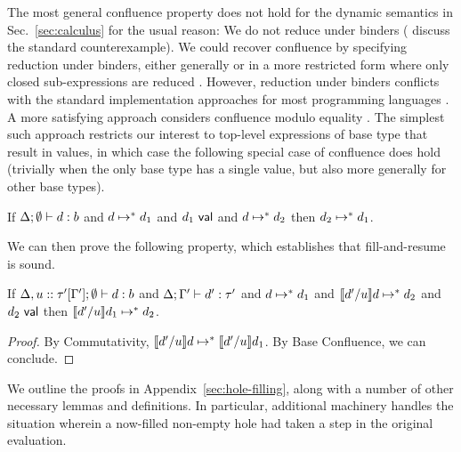 The most general confluence property does not hold for the dynamic
semantics in Sec.~\ref{sec:calculus} for the usual reason: We do not
reduce under binders (\citet{DBLP:conf/birthday/BlancLM05} discuss the
standard counterexample).
%
We could recover confluence by specifying reduction under binders,
either generally or in a more restricted form where only closed
sub-expressions are
reduced \cite{DBLP:journals/tcs/CagmanH98,DBLP:conf/birthday/BlancLM05,levy1999explicit}.
%
However, reduction under binders conflicts with the standard implementation approaches
for most programming languages \cite{DBLP:conf/birthday/BlancLM05}.
%
A more satisfying approach considers confluence modulo equality \cite{Huet:1980ng}. 
%
The simplest such approach restricts our interest to top-level expressions
of base type that result in values, in which case the following
special case of confluence does hold (trivially when the only base
type has a single value, but also more generally for other base
types).
\begin{lem}
  If $\Delta; \emptyset \vdash d : b$ and 
  $d \mapsto^* d_1$
  and $d_1~\mathsf{val}$
  and $d \mapsto^* d_2$
  then $d_2 \mapsto^* d_1$.
\end{lem}
We can then prove the following property, which establishes that fill-and-resume is sound.
\begin{thm}[Resumption]
  If $\Delta, u :: \tau'[\Gamma']; \emptyset \vdash d : b$
  and $\Delta; \Gamma' \vdash d' : \tau'$ 
  and $d \mapsto^* d_1$
  and $\llbracket d' / u\rrbracket d \mapsto^* d_2$
  and $d_2~\mathsf{val}$
  then $\llbracket d' / u\rrbracket d_1 \mapsto^* d_2$.
  \begin{proof}
    By Commutativity,
    $\llbracket d' / u\rrbracket d \mapsto^* \llbracket d' / u\rrbracket d_1$.
    By Base Confluence, we can conclude.
  \end{proof}
\end{thm}

We outline the proofs in Appendix~\ref{sec:hole-filling}, along with a
number of other necessary lemmas and definitions.
%
In particular, additional machinery handles the situation wherein a
now-filled non-empty hole had taken a step in the original evaluation.


